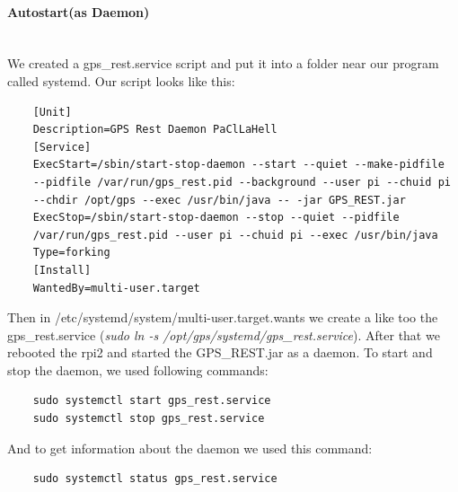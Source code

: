 \paragraph{Autostart(as Daemon)} \mbox{}\\
We created a gps\_rest.service script and put it into a folder near our program called systemd. Our script looks like this:
\begin{verbatim}
	[Unit]
	Description=GPS Rest Daemon PaClLaHell
	[Service]
	ExecStart=/sbin/start-stop-daemon --start --quiet --make-pidfile 
	--pidfile /var/run/gps_rest.pid --background --user pi --chuid pi 
	--chdir /opt/gps --exec /usr/bin/java -- -jar GPS_REST.jar
	ExecStop=/sbin/start-stop-daemon --stop --quiet --pidfile 
	/var/run/gps_rest.pid --user pi --chuid pi --exec /usr/bin/java
	Type=forking
	[Install]
	WantedBy=multi-user.target
\end{verbatim}
Then in /etc/systemd/system/multi-user.target.wants we create a like too the gps\_rest.service (\textit{sudo ln -s /opt/gps/systemd/gps\_rest.service}).
After that we rebooted the \gls{rpi2} and started the GPS\_REST.jar as a daemon.
To start and stop the daemon, we used following commands:
\begin{verbatim}
	sudo systemctl start gps_rest.service
	sudo systemctl stop gps_rest.service
\end{verbatim}
And to get information about the daemon we used this command:
\begin{verbatim}
	sudo systemctl status gps_rest.service
\end{verbatim}
